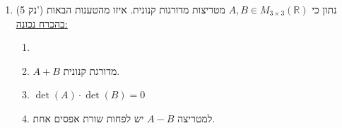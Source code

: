 \documentclass[12pt, a4paper]{article}
\newcommand{\rr}{\mathbb{R}}
\newcommand{\points}[1]{(#1 נק') }
\begin{document}
\begin{enumerate}
\underline{פתרון:}
סעיף (א) שגוי כי
$$A=\begin{pmatrix}
    1&0\\0&1\\
\end{pmatrix},B=\begin{pmatrix}
    1&0\\0&2\\
\end{pmatrix}$$
הן שקולות שורה אבל
$\det(A)=1\neq 2\det(B)$.
בדומה עבור דוגמה זו, מתקיים

$Ae_2=\begin{pmatrix}
    0\\1\\
\end{pmatrix}\neq \begin{pmatrix}
    0\\2\\
\end{pmatrix}=Be_2$
לכן סעיף (ג) שגוי.
כדי לפסול את סעיף (ד), נקח את המטריצות
$A=\begin{pmatrix}
  0&1\\0&0\\  
\end{pmatrix},B=\begin{pmatrix}
    0&1\\0&1\\
\end{pmatrix}$
שהן שקולות שורה אבל
$$A^2=\begin{pmatrix}
    0&0\\0&0\\
\end{pmatrix},
B^2=\begin{pmatrix}
    0&1\\0&1\\
\end{pmatrix}$$
ואלו כבר לא שקולות שורה.
לסיום, סעיף (ב) נכון כי אנו יודעים שאם מטריצות הן שקולות שורה (ניתן להגיע לאחת מהשנייה על ידי ביצוע פעולות שורה אלמנטריות) אז יש להן את אותה קבוצת פתרונות לממ״ל ההומוגנית, כלומר
$N(A)=N(B)$.



\noindent\rule{16cm}{0.4pt}
\item\points{5}
נתון כי
$A,B\in M_{3\times 3}(\rr)$
מטריצות מדורגות קנונית.
איזו מהטענות הבאות 
\underline{בהכרח נכונה:}
\begin{enumerate}
\item
{}
\item
$A+B$
מדורגת קנונית.
\item
$\det(A)\cdot \det(B)=0$
\item
למטריצה
$A-B$
יש לפחות שורת אפסים אחת.
\end{enumerate}


\end{enumerate}
\end{document}
